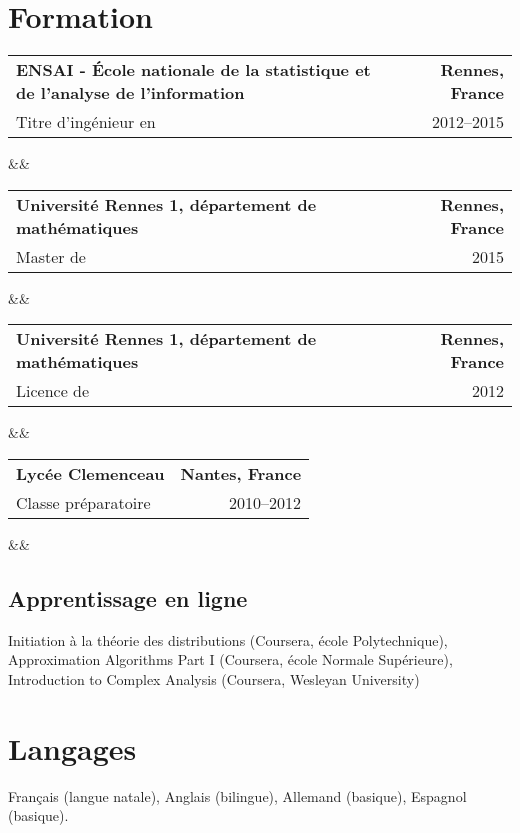 \documentclass[11pt,a4paper,sans]{moderncv} %
\makeatletter
\renewcommand*{\cventry}[7][.25em]{
\begin{tabular*}{\textwidth}{l@{\extracolsep{\fill}}r}%
{\bfseries #4} & {\bfseries #5} \\%
{#3\ifthenelse{\equal{#6}{}}{}{#6}}&{#2}\\%
\end{tabular*}%
\ifx&#7&%
\else{\\\vbox{\small#7}}\fi%
\par\addvspace{#1}}
\makeatother
\begin{document}

\section{Formation}
\cventry{2012--2015}{Titre d'ingénieur en }{ENSAI - École nationale de la statistique et de l'analyse de l'information}{Rennes, France}{génie statistique;}{}
\cventry{2015}{Master de }{Université Rennes 1, département de mathématiques}{Rennes, France}{statistique mathématique;}{}  %
\cventry{2012}{Licence de }{Université Rennes 1, département de mathématiques}{Rennes, France}{mathématiques;}{}
\cventry{2010--2012}{Classe préparatoire}{Lycée Clemenceau}{Nantes, France}{Filière MPSI - MP}{}

\medskip

\subsection{Apprentissage en ligne}
Initiation à la théorie des distributions (Coursera, école Polytechnique),
Approximation Algorithms Part I (Coursera, école Normale Supérieure),
Introduction to Complex Analysis (Coursera, Wesleyan University)



\section{Langages}
Français (langue natale), Anglais (bilingue), Allemand (basique), Espagnol (basique).
\end{document}
